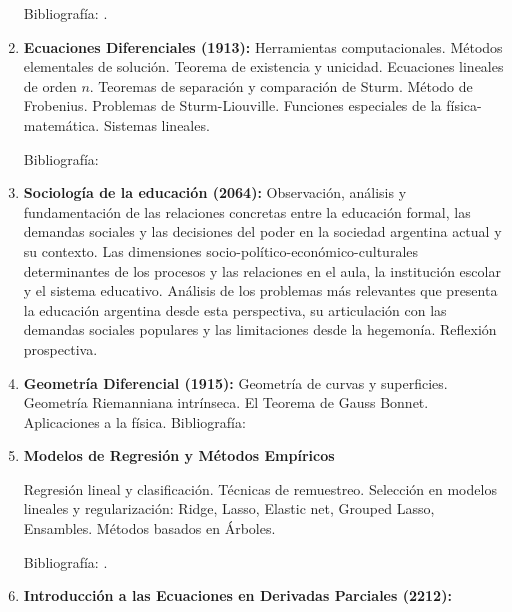 \documentclass[a4paper, 12pt]{article}
\begin{document}
\begin{enumerate}
Bibliografía: \cite{favazo, loeve, rudin70, EliasM.Stein105,TerenceTao123,A.N.Kolmogorov682,DavidM.Bressoud121,wheeden2015measure}.


\item\textbf{Ecuaciones Diferenciales (1913):} Herramientas computacionales. Métodos elementales de solución. Teorema de existencia y unicidad.  Ecuaciones lineales de orden $n$. Teoremas de separación y comparación de Sturm. Método de Frobenius.  Problemas de Sturm-Liouville. Funciones especiales de la física-matemática.  Sistemas lineales. 

Bibliografía: \cite{ GeorgeFinlaySimmons487,WilliamE.Boyce496, MorrisW.Hirsch540,JorgeSotomayor513,BarbaraD.MacCluer515,RichardS.Palais519,GarrettBirkhoff526}



\item\textbf{Sociología de la educación (2064):}  Observación, análisis y fundamentación de las relaciones concretas entre la educación formal, las demandas sociales y las decisiones del poder en la sociedad argentina actual y su contexto. Las dimensiones socio-político-económico-culturales determinantes de los procesos y las relaciones en el aula, la institución escolar y el sistema educativo. Análisis de los problemas más relevantes que presenta la educación argentina desde esta perspectiva, su articulación con las demandas sociales populares y las limitaciones desde la hegemonía. Reflexión prospectiva.  







\item\textbf{Geometría Diferencial (1915):} Geometría de curvas y superficies.
 Geometría Riemanniana
intrínseca. El Teorema de Gauss Bonnet. Aplicaciones a la física.
Bibliografía: \cite{aguirre07,barros21,barros19,costa05,docarmo95,hernandez10,lopez10,muñoz17,essley12,oneill}


\item\textbf{Modelos de Regresión y Métodos Empíricos}

Regresión lineal y clasificación. Técnicas de remuestreo. Selección en modelos lineales y regularización: Ridge, Lasso, Elastic net, Grouped Lasso, Ensambles.    Métodos basados en Árboles. 

Bibliografía: \cite{friedman, james, trevor, efron}.



\item\textbf{Introducción a las Ecuaciones en Derivadas Parciales (2212):}  



\end{enumerate}
\end{document}

